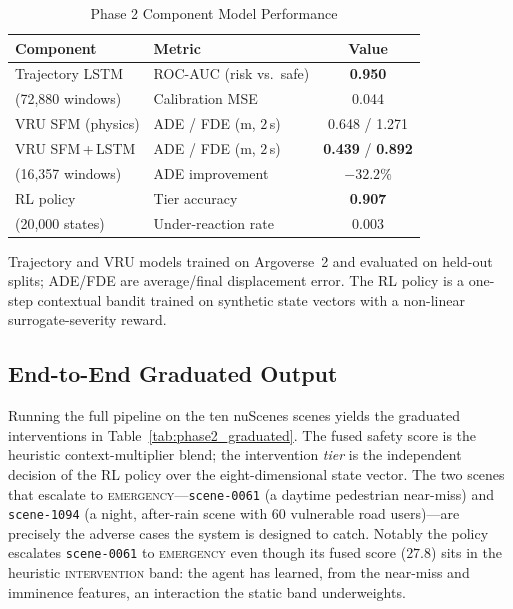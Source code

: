\begin{table}[htbp]
\caption{Phase 2 Component Model Performance}
\label{tab:phase2_components}
\centering
\begin{tabular}{llc}
\toprule
\textbf{Component} & \textbf{Metric} & \textbf{Value} \\
\midrule
Trajectory LSTM      & ROC-AUC (risk vs.\ safe) & \textbf{0.950} \\
(72{,}880 windows)   & Calibration MSE          & 0.044 \\
\midrule
VRU SFM (physics)    & ADE / FDE (m, $2$\,s)    & 0.648 / 1.271 \\
VRU SFM\,+\,LSTM     & ADE / FDE (m, $2$\,s)    & \textbf{0.439} / \textbf{0.892} \\
(16{,}357 windows)   & ADE improvement          & $-32.2\%$ \\
\midrule
RL policy            & Tier accuracy            & \textbf{0.907} \\
(20{,}000 states)    & Under-reaction rate      & 0.003 \\
\bottomrule
\end{tabular}
\vspace{2pt}
\footnotesize{Trajectory and VRU models trained on Argoverse~2 and evaluated on
held-out splits; ADE/FDE are average/final displacement error. The RL policy is a
one-step contextual bandit trained on synthetic state vectors with a non-linear
surrogate-severity reward.}
\end{table}

\subsection{End-to-End Graduated Output}
Running the full pipeline on the ten nuScenes scenes yields the graduated
interventions in Table~\ref{tab:phase2_graduated}. The fused safety score is the
heuristic context-multiplier blend; the intervention \emph{tier} is the
independent decision of the RL policy over the eight-dimensional state vector.
The two scenes that escalate to \textsc{emergency}---\texttt{scene-0061} (a
daytime pedestrian near-miss) and \texttt{scene-1094} (a night, after-rain scene
with 60 vulnerable road users)---are precisely the adverse cases the system is
designed to catch. Notably the policy escalates \texttt{scene-0061} to
\textsc{emergency} even though its fused score ($27.8$) sits in the heuristic
\textsc{intervention} band: the agent has learned, from the near-miss and
imminence features, an interaction the static band underweights.

